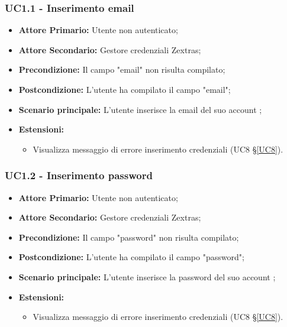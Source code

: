 \subsubsection{UC1.1 - Inserimento email}
\begin{itemize}
\item \textbf{Attore Primario:} Utente non autenticato;
\item \textbf{Attore Secondario:} Gestore credenziali Zextras;
\item \textbf{Precondizione:} Il campo "email" non risulta compilato;
\item \textbf{Postcondizione:} L'utente ha compilato il campo "email";
\item \textbf{Scenario principale:} L'utente inserisce la email del suo account ;
\item \textbf{Estensioni:}
\begin{itemize}
\item Visualizza messaggio di errore inserimento credenziali (UC8 \S{}\ref{UC8}).
\end{itemize}
\end{itemize}
\subsubsection{UC1.2 - Inserimento password}
\begin{itemize}
\item \textbf{Attore Primario:} Utente non autenticato;
\item \textbf{Attore Secondario:} Gestore credenziali Zextras;
\item \textbf{Precondizione:} Il campo "password" non risulta compilato;
\item \textbf{Postcondizione:} L'utente ha compilato il campo "password";
\item \textbf{Scenario principale:} L'utente inserisce la password del suo account ;
\item \textbf{Estensioni:}
\begin{itemize}
\item Visualizza messaggio di errore inserimento credenziali (UC8 \S{}\ref{UC8}).
\end{itemize}
\end{itemize}
